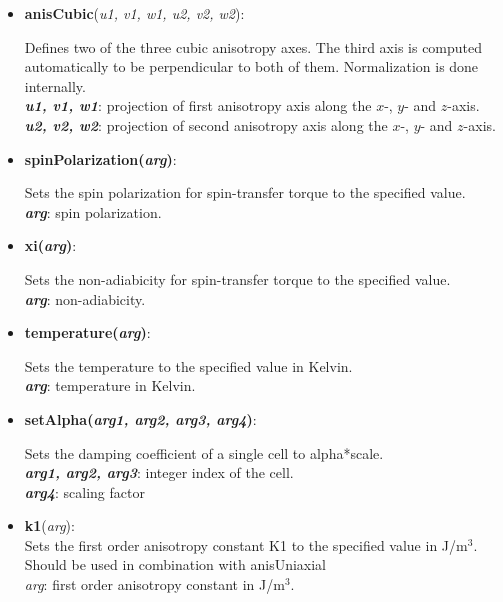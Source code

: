 \begin{itemize}
 \item {\vspace{-0.4cm}\textbf{anisCubic}(\textit{u1, v1, w1,  u2, v2, w2})}:
				\flushright\parbox{0.9 \textwidth}{\vspace{-0.25cm} 
				Defines two of the three cubic anisotropy axes. The third axis is computed automatically to be perpendicular to both of them. Normalization is done internally.\\
				\textbf{\textit{u1, v1, w1}}: projection of first anisotropy axis along the $x$-, $y$- and $z$-axis.
				\textbf{\textit{u2, v2, w2}}: projection of second anisotropy axis along the $x$-, $y$- and $z$-axis. }\flushleft

 \item {\vspace{-0.4cm}\textbf{spinPolarization(\textit{arg})}:
				\flushright\parbox{0.9 \textwidth}{\vspace{-0.25cm} 
				Sets the spin polarization for spin-transfer torque to the specified value.\\
				\textbf{\textit{arg}}: spin polarization.
				}\flushleft}

 \item {\vspace{-0.4cm}\textbf{xi(\textit{arg})}:
				\flushright\parbox{0.9 \textwidth}{\vspace{-0.25cm} 
				Sets the non-adiabicity for spin-transfer torque to the specified value.\\
				\textbf{\textit{arg}}: non-adiabicity.
				}\flushleft}

 \item {\vspace{-0.4cm}\textbf{temperature(\textit{arg})}:
				\flushright\parbox{0.9 \textwidth}{\vspace{-0.25cm} 
				Sets the temperature to the specified value in Kelvin.\\
				\textbf{\textit{arg}}: temperature in Kelvin.
				}\flushleft}

 \item {\vspace{-0.4cm}\textbf{setAlpha(\textit{arg1, arg2, arg3, arg4})}:
				\flushright\parbox{0.9 \textwidth}{\vspace{-0.25cm} 
				Sets the damping coefficient of a single cell to alpha*scale.\\
				\textbf{\textit{arg1, arg2, arg3}}: integer index of the cell.\\
				\textbf{\textit{arg4}}: scaling factor
				}\flushleft}

 \item \textbf{k1}(\textit{arg}):\\
				Sets the first order anisotropy constant K1 to the specified value in J/m$^3$.  Should be used in combination with anisUniaxial\\
				\textit{arg}: first order anisotropy constant in J/m$^3$.

\end{itemize}

